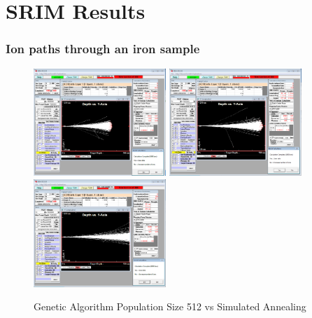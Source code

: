 \chapter{SRIM Results}



\FloatBarrier
\subsection{Ion paths through an iron sample}


\begin{figure}[!ht]
  \begin{center}
    \includegraphics[width=5.0cm]{appendix/srim_data/12MeV.png}
    \includegraphics[width=5.0cm]{appendix/srim_data/14MeV.png}
    \includegraphics[width=5.0cm]{appendix/srim_data/16MeV.png}
    \caption{Genetic Algorithm Population Size 512 vs Simulated Annealing}
    \label{fig:ga_vs_sim_512_3}
  \end{center}
\end{figure}

